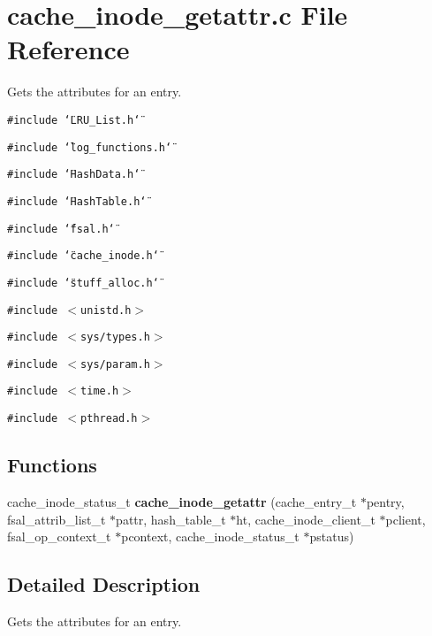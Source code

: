 \section{cache\_\-inode\_\-getattr.c File Reference}
\label{cache__inode__getattr_8c}
Gets the attributes for an entry. 

{\tt \#include \char`\"{}LRU\_\-List.h\char`\"{}}\par
{\tt \#include \char`\"{}log\_\-functions.h\char`\"{}}\par
{\tt \#include \char`\"{}Hash\-Data.h\char`\"{}}\par
{\tt \#include \char`\"{}Hash\-Table.h\char`\"{}}\par
{\tt \#include \char`\"{}fsal.h\char`\"{}}\par
{\tt \#include \char`\"{}cache\_\-inode.h\char`\"{}}\par
{\tt \#include \char`\"{}stuff\_\-alloc.h\char`\"{}}\par
{\tt \#include $<$unistd.h$>$}\par
{\tt \#include $<$sys/types.h$>$}\par
{\tt \#include $<$sys/param.h$>$}\par
{\tt \#include $<$time.h$>$}\par
{\tt \#include $<$pthread.h$>$}\par
\subsection*{Functions}
\begin{CompactItemize}
\item 
cache\_\-inode\_\-status\_\-t {\bf cache\_\-inode\_\-getattr} (cache\_\-entry\_\-t $\ast$pentry, fsal\_\-attrib\_\-list\_\-t $\ast$pattr, hash\_\-table\_\-t $\ast$ht, cache\_\-inode\_\-client\_\-t $\ast$pclient, fsal\_\-op\_\-context\_\-t $\ast$pcontext, cache\_\-inode\_\-status\_\-t $\ast$pstatus)
\end{CompactItemize}


\subsection{Detailed Description}
Gets the attributes for an entry. 

